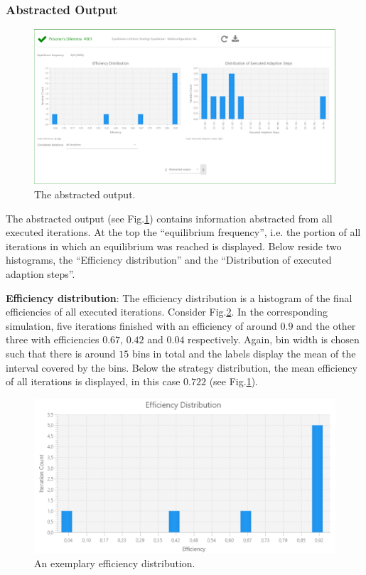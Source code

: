 \documentclass[parskip=full,11pt]{scrartcl}
\newcommand*\circled[1]{\tikz[baseline=(char.base)]{
            \node[shape=circle,draw,inner sep=2pt] (char) {#1};}}
\begin{document}
\subsubsection{Abstracted Output}
\begin{figure}
	\centering
	\includegraphics[width=\linewidth]{img_manual/abstracted_output.png}
	\caption{The abstracted output.}
	\label{fig:abstracted_output}
\end{figure}
The abstracted output (see Fig.\ref{fig:abstracted_output}) contains information abstracted from all executed iterations. At the top \circled{1} the \enquote{equilibrium frequency}, i.e. the portion of all iterations in which an equilibrium was reached is displayed. Below reside two histograms, the \enquote{Efficiency distribution} and the \enquote{Distribution of executed adaption steps}.

\textbf{Efficiency distribution}: The efficiency distribution \circled{2} is a histogram of the final efficiencies of all executed iterations. Consider Fig.\ref{fig:efficiency_distribution}. In the corresponding simulation, five iterations finished with an efficiency of around \(0.9\) and the other three with efficiencies \(0.67\), \(0.42\) and \(0.04\) respectively. Again, bin width is chosen such that there is around \(15\) bins in total and the labels display the mean of the interval covered by the bins. Below the strategy distribution, the mean efficiency of all iterations is displayed, in this case \(0.722\) (see Fig.\ref{fig:abstracted_output}).

\begin{figure}[h]
	\centering
	\includegraphics[width=0.8\linewidth]{img_manual/efficiency_distribution.png}
	\caption{An exemplary efficiency distribution.}
	\label{fig:efficiency_distribution}
\end{figure}
\end{document}
